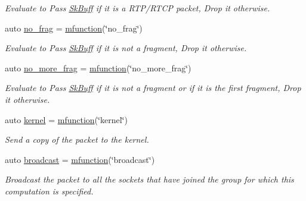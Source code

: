 \begin{DoxyCompactItemize}
\begin{DoxyCompactList}\small\item\em Evaluate to {\ttfamily Pass} \hyperlink{structpfq_1_1lang_1_1SkBuff}{Sk\+Buff} if it is a R\+T\+P/\+R\+T\+C\+P packet, {\ttfamily Drop} it otherwise. \end{DoxyCompactList}\item 
auto \hyperlink{namespacepfq_1_1lang_1_1anonymous__namespace_02default_8hpp_03_a4cfaf018f687a1563161b8f4245a6652}{no\+\_\+frag} = \hyperlink{namespacepfq_1_1lang_ac3ec84f09576bf5fb5db464623a4c165}{mfunction}(\char`\"{}no\+\_\+frag\char`\"{})
\begin{DoxyCompactList}\small\item\em Evaluate to {\ttfamily Pass} \hyperlink{structpfq_1_1lang_1_1SkBuff}{Sk\+Buff} if it is not a fragment, {\ttfamily Drop} it otherwise. \end{DoxyCompactList}\item 
auto \hyperlink{namespacepfq_1_1lang_1_1anonymous__namespace_02default_8hpp_03_a88628ce70e2a650af1338851373b9891}{no\+\_\+more\+\_\+frag} = \hyperlink{namespacepfq_1_1lang_ac3ec84f09576bf5fb5db464623a4c165}{mfunction}(\char`\"{}no\+\_\+more\+\_\+frag\char`\"{})
\begin{DoxyCompactList}\small\item\em Evaluate to {\ttfamily Pass} \hyperlink{structpfq_1_1lang_1_1SkBuff}{Sk\+Buff} if it is not a fragment or if it is the first fragment, {\ttfamily Drop} it otherwise. \end{DoxyCompactList}\item 
auto \hyperlink{namespacepfq_1_1lang_1_1anonymous__namespace_02default_8hpp_03_a93294225145f96c6aa6cf0cedfa19103}{kernel} = \hyperlink{namespacepfq_1_1lang_ac3ec84f09576bf5fb5db464623a4c165}{mfunction}(\char`\"{}kernel\char`\"{})
\begin{DoxyCompactList}\small\item\em Send a copy of the packet to the kernel. \end{DoxyCompactList}\item 
auto \hyperlink{namespacepfq_1_1lang_1_1anonymous__namespace_02default_8hpp_03_ac9e0f3ad7fa32146565f4aaab709d19d}{broadcast} = \hyperlink{namespacepfq_1_1lang_ac3ec84f09576bf5fb5db464623a4c165}{mfunction}(\char`\"{}broadcast\char`\"{})
\begin{DoxyCompactList}\small\item\em Broadcast the packet to all the sockets that have joined the group for which this computation is specified. \end{DoxyCompactList}\item 

\end{DoxyCompactItemize}

